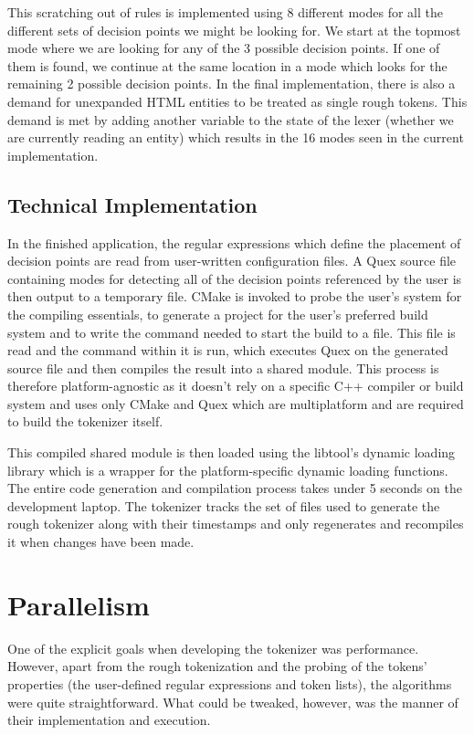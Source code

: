 This scratching out of rules is implemented using 8 different modes for all the
different sets of decision points we might be looking for. We start at the
topmost mode where we are looking for any of the 3 possible decision points. If
one of them is found, we continue at the same location in a mode which looks
for the remaining 2 possible decision points. In the final implementation,
there is also a demand for unexpanded HTML entities to be treated as single
rough tokens. This demand is met by adding another variable to the state of
the lexer (whether we are currently reading an entity) which results in the
16 modes seen in the current implementation.

\subsection{Technical Implementation}
\label{ssec:impl-roughtok-technical}

In the finished application, the regular expressions which define the placement
of decision points are read from user-written configuration files. A Quex
source file containing modes for detecting all of the decision points
referenced by the user is then output to a temporary file. CMake is invoked to
probe the user's system for the compiling essentials, to generate a project for
the user's preferred build system and to write the command needed to start the
build to a file. This file is read and the command within it is run, which
executes Quex on the generated source file and then compiles the result into a
shared module. This process is therefore platform-agnostic as it doesn't rely
on a specific C++ compiler or build system and uses only CMake and Quex which
are multiplatform and are required to build the tokenizer itself.

This compiled shared module is then loaded using the libtool's dynamic loading
library which is a wrapper for the platform-specific dynamic loading functions.
The entire code generation and compilation process takes under 5 seconds on the
development laptop. The tokenizer tracks the set of files used to generate the
rough tokenizer along with their timestamps and only regenerates and recompiles
it when changes have been made.

\section{Parallelism}
\label{sec:impl-parallel}

One of the explicit goals when developing the tokenizer was performance.
However, apart from the rough tokenization and the probing of the tokens'
properties (the user-defined regular expressions and token lists), the
algorithms were quite straightforward. What could be tweaked, however, was the
manner of their implementation and execution. 

